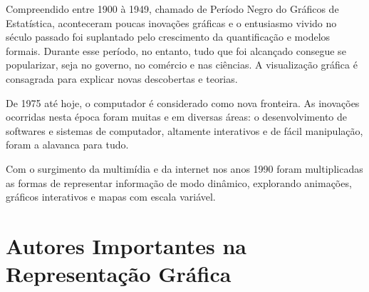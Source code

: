 \inic Compreendido entre 1900 à 1949, chamado de Período Negro do Gráficos de Estatística, aconteceram poucas inovações gráficas e o entusiasmo vivido no século passado foi suplantado pelo crescimento da quantificação e modelos formais. Durante esse período, no entanto, tudo que foi alcançado consegue se popularizar, seja no governo, no comércio e nas ciências. A visualização gráfica é consagrada para explicar novas descobertas e teorias.
\vskip0.3cm 


\inic De 1975 até hoje, o computador é considerado como nova fronteira. As inovações ocorridas nesta época foram muitas e em diversas áreas: o desenvolvimento de softwares e sistemas de computador,
altamente interativos e de fácil manipulação, foram a alavanca para tudo.\vskip0.3cm  


\inic Com o surgimento da multimídia e da internet nos anos
1990 foram multiplicadas as formas de representar informação de modo dinâmico,
explorando animações, gráficos interativos e mapas com escala variável.



\section{Autores Importantes na Representação Gráfica}

